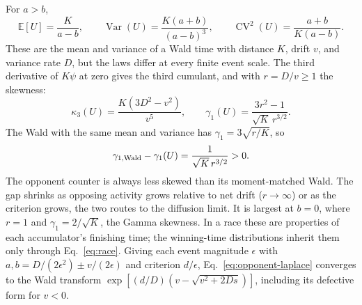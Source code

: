 \documentclass[12pt]{article}
\newcommand{\E}{\mathbb{E}}
\newcommand{\Var}{\operatorname{Var}}
\theoremstyle{definition}
\theoremstyle{plain}
\theoremstyle{remark}
\begin{document}
For $a>b$,
\begin{equation}
 \E[U]=\frac K{a-b},\qquad \Var(U)=\frac{K(a+b)}{(a-b)^3},\qquad
 \operatorname{CV}^2(U)=\frac{a+b}{K(a-b)}.\label{eq:opponent-moments}
\end{equation}
These are the mean and variance of a Wald time with distance $K$, drift $v$, and variance rate $D$, but the laws differ at every finite event scale. The third derivative of $K\psi$ at zero gives the third cumulant, and with $r=D/v\geq1$ the skewness:
\begin{equation}
 \kappa_3(U)=\frac{K(3D^2-v^2)}{v^5},\qquad
 \gamma_1(U)=\frac{3r^2-1}{\sqrt K\,r^{3/2}}.\label{eq:opponent-skew}
\end{equation}
The Wald with the same mean and variance has $\gamma_1=3\sqrt{r/K}$, so
\begin{equation}
 \gamma_{1,\rm Wald}-\gamma_{1}(U)=\frac1{\sqrt K\,r^{3/2}}>0.\label{eq:opponent-skew-gap}
\end{equation}
The opponent counter is always less skewed than its moment-matched Wald. The gap shrinks as opposing activity grows relative to net drift ($r\to\infty$) or as the criterion grows, the two routes to the diffusion limit. It is largest at $b=0$, where $r=1$ and $\gamma_1=2/\sqrt K$, the Gamma skewness. In a race these are properties of each accumulator's finishing time; the winning-time distributions inherit them only through Eq.~\eqref{eq:race}. Giving each event magnitude $\epsilon$ with $a,b=D/(2\epsilon^2)\pm v/(2\epsilon)$ and criterion $d/\epsilon$, Eq.~\eqref{eq:opponent-laplace} converges to the Wald transform $\exp[(d/D)(v-\sqrt{v^2+2Ds})]$, including its defective form for $v<0$.
\end{document}
